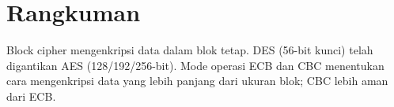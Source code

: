 \section*{Rangkuman}
Block cipher mengenkripsi data dalam blok tetap. DES (56-bit kunci) telah digantikan AES (128/192/256-bit). Mode operasi ECB dan CBC menentukan cara mengenkripsi data yang lebih panjang dari ukuran blok; CBC lebih aman dari ECB.
